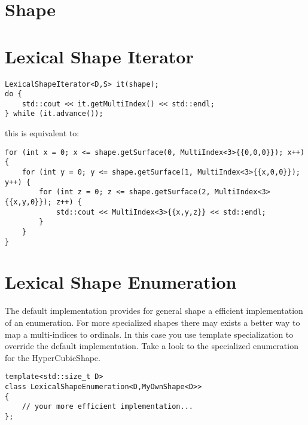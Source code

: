 \documentclass{article}
\begin{document}
\section{Shape}



\section{Lexical Shape Iterator}

\begin{listing}[h!]
\begin{verbatim}
LexicalShapeIterator<D,S> it(shape);
do {
    std::cout << it.getMultiIndex() << std::endl;
} while (it.advance());
\end{verbatim}
\end{listing}
this is equivalent to:
\begin{listing}[h!]
\begin{verbatim}
for (int x = 0; x <= shape.getSurface(0, MultiIndex<3>{{0,0,0}}); x++) {
    for (int y = 0; y <= shape.getSurface(1, MultiIndex<3>{{x,0,0}}); y++) {
        for (int z = 0; z <= shape.getSurface(2, MultiIndex<3>{{x,y,0}}); z++) {
            std::cout << MultiIndex<3>{{x,y,z}} << std::endl;
        }
    }
}
\end{verbatim}
\end{listing}


\section{Lexical Shape Enumeration}

The default implementation provides for general shape a efficient implementation of an enumeration. For more specialized shapes there may exists a better way to map a multi-indices to ordinals. In this case you use template specialization to override the default implementation. Take a look to the specialized enumeration for the HyperCubicShape.

\begin{verbatim}
template<std::size_t D>
class LexicalShapeEnumeration<D,MyOwnShape<D>>
{
    // your more efficient implementation...
};
\end{verbatim}
\end{document}
